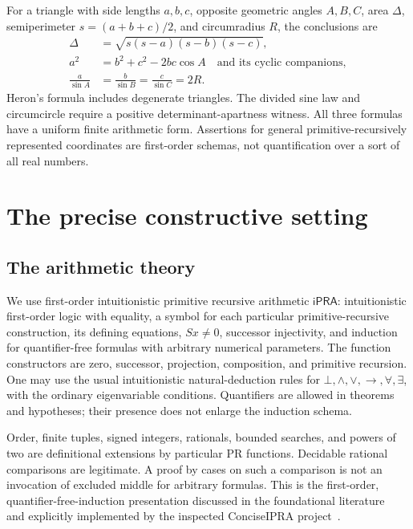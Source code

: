 \documentclass[11pt,a4paper]{article}
\theoremstyle{definition}
\newcommand{\ipra}{\mathsf{iPRA}}
\numberwithin{equation}{section}
\begin{document}
For a triangle with side lengths \(a,b,c\), opposite geometric angles
\(A,B,C\), area \(\Delta\), semiperimeter \(s=(a+b+c)/2\), and circumradius
\(R\), the conclusions are
\begin{align*}
 \Delta&=\sqrt{s(s-a)(s-b)(s-c)},\\
 a^{2}&=b^{2}+c^{2}-2bc\cos A
       \quad\text{and its cyclic companions},\\
 \frac{a}{\sin A}&=\frac{b}{\sin B}
                 =\frac{c}{\sin C}=2R.
\end{align*}
Heron's formula includes degenerate triangles. The divided sine law and
circumcircle require a positive determinant-apartness witness. All three
formulas have a uniform finite arithmetic form. Assertions for general
primitive-recursively represented coordinates are first-order schemas,
not quantification over a sort of all real numbers.

\newpage
\begingroup
\small
\setlength{\parskip}{0pt}
\tableofcontents
\endgroup
\newpage

\section{The precise constructive setting}\label{sec:setting}

\subsection{The arithmetic theory}

We use first-order intuitionistic primitive recursive arithmetic
\(\ipra\): intuitionistic first-order logic with equality, a symbol for
each particular primitive-recursive construction, its defining equations,
\(Sx\ne0\), successor injectivity, and induction for quantifier-free
formulas with arbitrary numerical parameters. The function constructors
are zero, successor, projection, composition, and primitive recursion.
One may use the usual intuitionistic natural-deduction rules for
\(\bot,\wedge,\vee,\to,\forall,\exists\), with the ordinary eigenvariable
conditions. Quantifiers are allowed in theorems and hypotheses; their
presence does not enlarge the induction schema.

Order, finite tuples, signed integers, rationals, bounded searches, and
powers of two are definitional extensions by particular PR functions.
Decidable rational comparisons are legitimate. A proof by cases on such
a comparison is not an invocation of excluded middle for arbitrary
formulas. This is the first-order, quantifier-free-induction presentation
discussed in the foundational literature~\cite{moschovakis} and explicitly
implemented by the inspected ConciseIPRA project~\cite{pr-source}.
\end{document}

